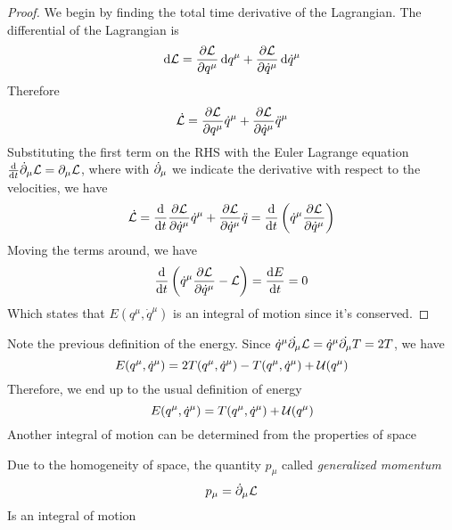 \documentclass[../admech.tex]{subfiles}
\begin{document}
\begin{proof}
	We begin by finding the total time derivative of the Lagrangian. The differential of the Lagrangian is
	\begin{equation*}
		\dd{\mathcal{L}}=\pdv{\mathcal{L}}{q^\mu}\dd{q^\mu}+\pdv{\mathcal{L}}{\dot{q}^\mu}\dd{\dot{q}^\mu}
	\end{equation*}
	Therefore
	\begin{equation*}
		\dot{\mathcal{L}}=\pdv{\mathcal{L}}{q^\mu}\dot{q}^\mu+\pdv{\mathcal{L}}{\dot{q}^\mu}\ddot{q}^\mu
	\end{equation*}
	Substituting the first term on the RHS with the Euler Lagrange equation $\dv{t}\dot{\partial}_\mu\mathcal{L}=\partial_\mu\mathcal{L}$, where with $\dot{\partial}_\mu$ we indicate the derivative with respect to the velocities, we have
	\begin{equation*}
		\dot{\mathcal{L}}=\dv{t}\pdv{\mathcal{L}}{\dot{q}^\mu}\dot{q}^\mu+\pdv{\mathcal{L}}{\dot{q}^\mu}\ddot{q}=\dv{t}\left( \dot{q}^\mu\pdv{\mathcal{L}}{\dot{q}^\mu} \right)
	\end{equation*}
	Moving the terms around, we have
	\begin{equation*}
		\dv{t}\left( \dot{q}^\mu\pdv{\mathcal{L}}{\dot{q}^\mu}-\mathcal{L} \right)=\dv{E}{t}=0
	\end{equation*}
	Which states that $E(q^\mu,\dot{q}^\mu)$ is an integral of motion since it's conserved.
\end{proof}
Note the previous definition of the energy. Since $\dot{q}^\mu\dot{\partial_\mu}\mathcal{L}=\dot{q}^\mu\dot{\partial_\mu}T=2T$, we have
\begin{equation*}
	E(q^\mu,\dot{q}^\mu)=2T(q^\mu,\dot{q}^\mu)-T(q^\mu,\dot{q}^\mu)+\mathcal{U}(q^\mu)
\end{equation*}
Therefore, we end up to the usual definition of energy
\begin{equation}
	E(q^\mu,\dot{q}^\mu)=T(q^\mu,\dot{q}^\mu)+\mathcal{U}(q^\mu)
	\label{eq:genenergyis}
\end{equation}
Another integral of motion can be determined from the properties of space
\begin{thm}
	Due to the homogeneity of space, the quantity $p_\mu$ called \emph{generalized momentum}
	\begin{equation}
		p_\mu=\dot{\partial}_\mu\mathcal{L}
		\label{eq:genmom}
	\end{equation}
	Is an integral of motion
\end{thm}
\end{document}
